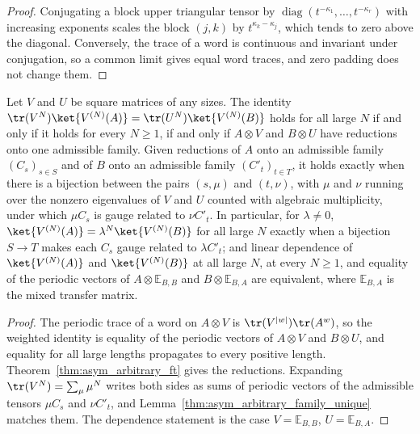 \begin{proof}
    \leanok
    Conjugating a block upper triangular tensor by
    $\operatorname{diag}(t^{-\kappa_1},\ldots,t^{-\kappa_r})$ with
    increasing exponents scales the block $(j,k)$ by $t^{\kappa_k-\kappa_j}$,
    which tends to zero above the diagonal. Conversely, the trace of a word
    is continuous and invariant under conjugation, so a common limit gives
    equal word traces, and zero padding does not change them.
\end{proof}

\begin{corollary}
    \label{thm:asym_arbitrary_weighted}
    \leanok
    Let $V$ and $U$ be square matrices of any sizes. The identity
    $\tr(V^N)\ket{V^{(N)}(A)}=\tr(U^N)\ket{V^{(N)}(B)}$ holds for all
    large $N$ if and only if it holds for every $N\geq1$, if and only if
    $A\otimes V$ and $B\otimes U$ have reductions onto one admissible family.
    Given reductions of $A$ onto an admissible family $(C_s)_{s\in S}$ and of
    $B$ onto an admissible family $(C'_t)_{t\in T}$, it holds exactly when
    there is a bijection between the pairs $(s,\mu)$ and $(t,\nu)$, with
    $\mu$ and $\nu$ running over the nonzero eigenvalues of $V$ and $U$
    counted with algebraic multiplicity, under which $\mu C_s$ is gauge
    related to $\nu C'_t$. In particular, for $\lambda\neq0$,
    $\ket{V^{(N)}(A)}=\lambda^N\ket{V^{(N)}(B)}$ for all large $N$ exactly
    when a bijection $S\to T$ makes each $C_s$ gauge related to
    $\lambda C'_t$; and linear dependence of $\ket{V^{(N)}(A)}$ and
    $\ket{V^{(N)}(B)}$ at all large $N$, at every $N\geq1$, and equality of
    the periodic vectors of $A\otimes\mathbb E_{B,B}$ and
    $B\otimes\mathbb E_{B,A}$ are equivalent, where $\mathbb E_{B,A}$ is
    the mixed transfer matrix.
\end{corollary}

\begin{proof}
    \leanok
    The periodic trace of a word on $A\otimes V$ is $\tr(V^{|w|})\tr(A^w)$,
    so the weighted identity is equality of the periodic vectors of
    $A\otimes V$ and $B\otimes U$, and equality for all large lengths
    propagates to every positive length.
    Theorem~\ref{thm:asym_arbitrary_ft} gives the reductions. Expanding
    $\tr(V^N)=\sum_\mu\mu^N$ writes both sides as sums of periodic vectors of
    the admissible tensors $\mu C_s$ and $\nu C'_t$, and
    Lemma~\ref{thm:asym_arbitrary_family_unique} matches them. The
    dependence statement is the case $V=\mathbb E_{B,B}$,
    $U=\mathbb E_{B,A}$.
\end{proof}
